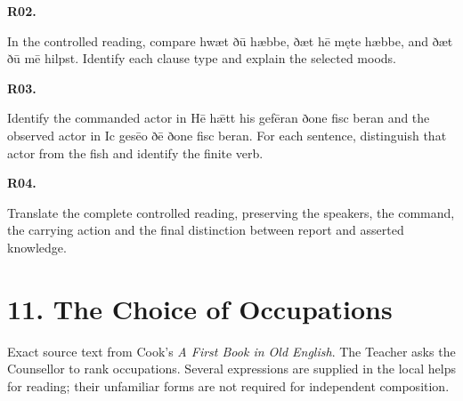 \par\begin{minipage}{\linewidth}\raggedright
\textbf{R02.}

In the controlled reading, compare hwæt ðū hæbbe, ðæt hē męte hæbbe, and ðæt ðū mē hilpst. Identify each clause type and explain the selected moods.

\end{minipage}\par\addvspace{4pt}

\par\begin{minipage}{\linewidth}\raggedright
\textbf{R03.}

Identify the commanded actor in Hē hǣtt his gefēran ðone fisc beran and the observed actor in Ic gesēo ðē ðone fisc beran. For each sentence, distinguish that actor from the fish and identify the finite verb.

\end{minipage}\par\addvspace{4pt}

\par\begin{minipage}{\linewidth}\raggedright
\textbf{R04.}

Translate the complete controlled reading, preserving the speakers, the command, the carrying action and the final distinction between report and asserted knowledge.

\end{minipage}\par\addvspace{4pt}

\section*{11. The Choice of Occupations}

Exact source text from Cook’s \emph{A First Book in Old English}. The Teacher asks the Counsellor to rank occupations. Several expressions are supplied in the local helps for reading; their unfamiliar forms are not required for independent composition.

